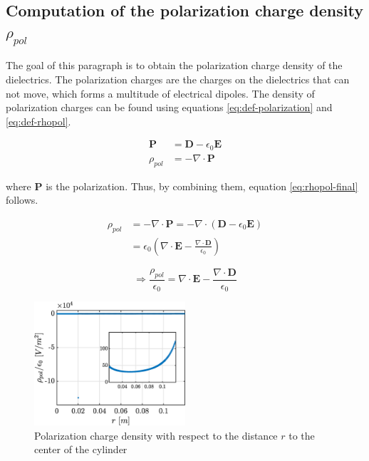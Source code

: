 \documentclass[a4paper,12pt,twoside]{article}
\newcommand{\mbf}[1]{\mathbf{#1}} %
\newcommand{\Div}[1]{\nabla\cdot\mathbf{#1}}
\newcommand{\bracket}[1]{\left(#1\right)}
\begin{document}
  \subsection{Computation of the polarization charge density $\rho_{pol}$}
    The goal of this paragraph is to obtain the polarization charge density of the dielectrics.
    The polarization charges are the charges on the dielectrics that can not move, which forms a multitude of electrical dipoles. \cite{feynman:dielectrics}
    The density of polarization charges can be found using equations \eqref{eq:def-polarization} and \eqref{eq:def-rhopol}.

    \begin{align}
      \mbf{P} &= \mbf{D} - \epsilon_0\mbf{E}
      \label{eq:def-polarization} \\
      \rho_{pol} &= -\Div{\mbf{P}}
      \label{eq:def-rhopol}
    \end{align}

    where $\mbf{P}$ is the polarization.
    Thus, by combining them, equation \eqref{eq:rhopol-final} follows.

    \begin{align*}
      \rho_{pol} &= -\Div{\mbf{P}} = -\nabla\cdot\bracket{\mbf{D} - \epsilon_0\mbf{E}}\\
                 &= \epsilon_0\bracket{\Div{E} - \frac{\Div{D}}{\epsilon_0}}
    \end{align*}

    \begin{equation}
      \Rightarrow \boxed{\frac{\rho_{pol}}{\epsilon_0} = \Div{E} - \frac{\Div{D}}{\epsilon_0}}
      \label{eq:rhopol-final}
    \end{equation}


    \begin{figure}[h]
      \centering
      \includegraphics[width=0.5\textwidth]{graphs/exdii-rhopol.eps}
      \caption{Polarization charge density with respect to the distance $r$ to the center of the cylinder}
      \label{fig:rhopol}
    \end{figure}
\end{document}
